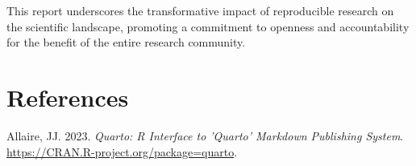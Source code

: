 \documentclass[
  a4paper,
  oneside,
  open=any]{scrbook}
\newlength{\cslhangindent}
\newenvironment{CSLReferences}[2] %
 {\begin{list}{}{%
  \setlength{\itemindent}{0pt}
  \setlength{\leftmargin}{0pt}
  \setlength{\parsep}{0pt}
  \ifodd #1
   \setlength{\leftmargin}{\cslhangindent}
   \setlength{\itemindent}{-1\cslhangindent}
  \fi
  \setlength{\itemsep}{#2\baselineskip}}}
 {\end{list}}
\begin{document}
This report underscores the transformative impact of reproducible
research on the scientific landscape, promoting a commitment to openness
and accountability for the benefit of the entire research community.

\section*{References}\label{references}

\label{refs}
\begin{CSLReferences}{1}{0}
Allaire, JJ. 2023. \emph{Quarto: R Interface to 'Quarto' Markdown
Publishing System}. \url{https://CRAN.R-project.org/package=quarto}.

\end{CSLReferences}


\backmatter
\end{document}
